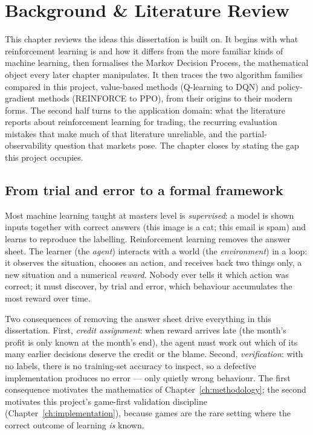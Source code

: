 \chapter{Background \& Literature Review}
\label{ch:background}

This chapter reviews the ideas this dissertation is built on. It begins
with what reinforcement learning is and how it differs from the more
familiar kinds of machine learning, then formalises the Markov Decision
Process, the mathematical object every later chapter manipulates. It then
traces the two algorithm families compared in this project, value-based
methods (Q-learning to DQN) and policy-gradient methods (REINFORCE to
PPO), from their origins to their modern forms. The second half turns
to the application domain: what the literature reports about
reinforcement learning for trading, the recurring evaluation mistakes
that make much of that literature unreliable, and the partial-observability
question that markets pose. The chapter closes by stating the gap this
project occupies.

\section{From trial and error to a formal framework}
\label{sec:bg_intro}

Most machine learning taught at masters level is \emph{supervised}: a
model is shown inputs together with correct answers (this image is a cat;
this email is spam) and learns to reproduce the labelling. Reinforcement
learning \cite{sutton2018} removes the answer sheet. The learner (the
\emph{agent}) interacts with a world (the \emph{environment}) in a loop:
it observes the situation, chooses an action, and receives back two
things only, a new situation and a numerical \emph{reward}. Nobody
ever tells it which action was correct; it must discover, by trial and
error, which behaviour accumulates the most reward over time.

Two consequences of removing the answer sheet drive everything in this
dissertation. First, \emph{credit assignment}: when reward arrives late
(the month's profit is only known at the month's end), the agent must
work out which of its many earlier decisions deserve the credit or the
blame. Second, \emph{verification}: with no labels, there is no
training-set accuracy to inspect, so a defective implementation produces
no error --- only quietly wrong behaviour. The first consequence
motivates the mathematics of Chapter~\ref{ch:methodology}; the second
motivates this project's game-first validation discipline
(Chapter~\ref{ch:implementation}), because games are the rare setting
where the correct outcome of learning \emph{is} known.

